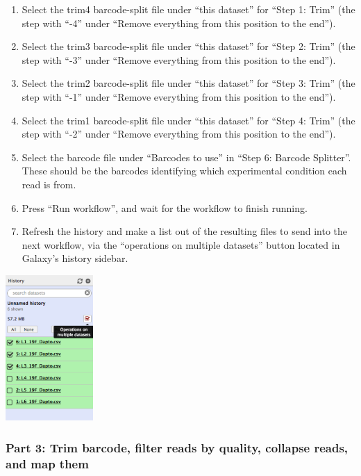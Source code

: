 \documentclass[11pt,]{article}
\providecommand{\tightlist}{%
  \setlength{\itemsep}{0pt}\setlength{\parskip}{0pt}}
\begin{document}
\begin{enumerate}
\def\labelenumi{\arabic{enumi}.}
\setcounter{enumi}{1}
\tightlist
\item
  Select the trim4 barcode-split file under ``this dataset'' for ``Step
  1: Trim'' (the step with ``-4'' under ``Remove everything from this
  position to the end'').
\item
  Select the trim3 barcode-split file under ``this dataset'' for ``Step
  2: Trim'' (the step with ``-3'' under ``Remove everything from this
  position to the end'').
\item
  Select the trim2 barcode-split file under ``this dataset'' for ``Step
  3: Trim'' (the step with ``-1'' under ``Remove everything from this
  position to the end'').
\item
  Select the trim1 barcode-split file under ``this dataset'' for ``Step
  4: Trim'' (the step with ``-2'' under ``Remove everything from this
  position to the end'').
\item
  Select the barcode file under ``Barcodes to use'' in ``Step 6: Barcode
  Splitter''. These should be the barcodes identifying which
  experimental condition each read is from.
\item
  Press ``Run workflow'', and wait for the workflow to finish running.
\item
  Refresh the history and make a list out of the resulting files to send
  into the next workflow, via the ``operations on multiple datasets''
  button located in Galaxy's history sidebar.
\end{enumerate}

\centerline{\includegraphics[width=0.25\textwidth]{figs/opButton.png}}

\subsubsection{Part 3: Trim barcode, filter reads by quality, collapse
reads, and map
them}\label{part-3-trim-barcode-filter-reads-by-quality-collapse-reads-and-map-them}
\end{document}
